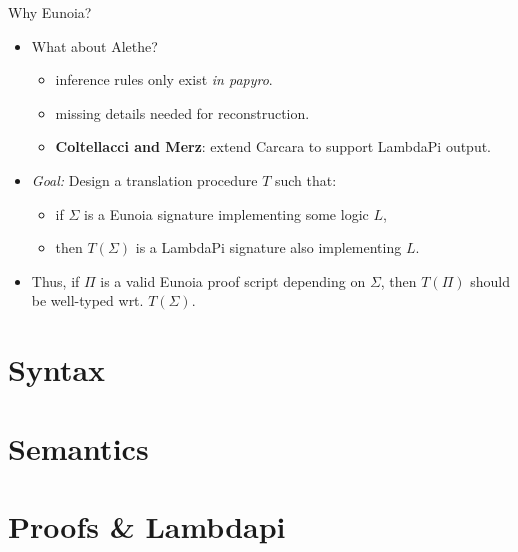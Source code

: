 \documentclass[lualatex, 12pt, handout]{beamer}
\begin{document}
\begin{frame}{Why Eunoia?}
	\begin{itemize}
		\item<+-> What about Alethe?
		      \begin{itemize}
			      \item<+-> inference rules only exist \emph{in papyro}.
			      \item<+-> missing details needed for reconstruction.
			      \item<+->
			            \textbf{Coltellacci and Merz}: extend \alert{Carcara}
			            to support LambdaPi output.
		      \end{itemize}
	\end{itemize}
\end{frame}

\begin{frame}{}
	\begin{itemize}
		\item<+-> \emph{\color{oc-green-9}Goal:}
		      Design a translation procedure $T$ such that:
		      \begin{itemize}
			      \item<+-> if $Σ$ is a Eunoia signature implementing some \alert{logic} $L$,
			      \item<+-> then $T(Σ)$ is a LambdaPi signature also implementing $L$.
			            \\[2mm]
		      \end{itemize}

		\item<+-> Thus, if $Π$ is a valid Eunoia \alert{proof script} depending on $Σ$,
		      then $T(Π)$ should be \alert{well-typed} wrt. $T(Σ)$.
	\end{itemize}
\end{frame}

\section{Syntax}



\section{Semantics}


\section{Proofs \& Lambdapi}










\end{document}
